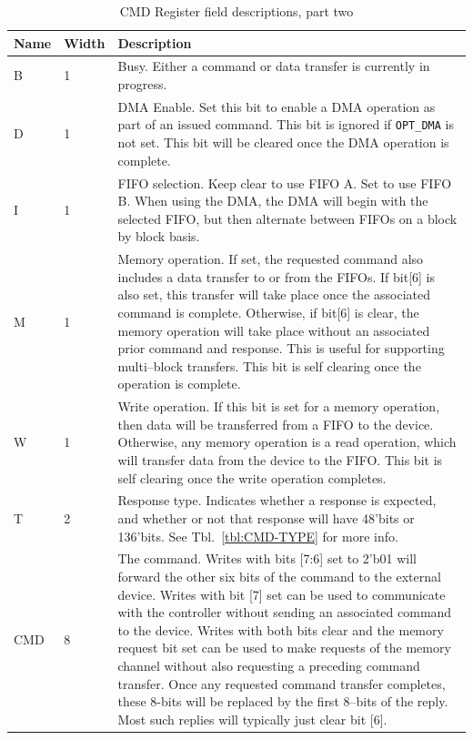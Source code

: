 \documentclass{gqtekspec}
\begin{document}
\begin{table}\begin{center}
\begin{tabular}{|p{1.2in}|p{0.5in}|p{4.0in}|}\hline
	\rowcolor[gray]{0.85} Name & Width & Description\\\hline\hline
B & 1 & Busy.  Either a command or data transfer is currently in
	progress.\\
D & 1 & DMA Enable.  Set this bit to enable a DMA operation as part of an
	issued command.  This bit is ignored if {\tt OPT\_DMA} is not set.
	This bit will be cleared once the DMA operation is complete.\\
I & 1 & FIFO selection.  Keep clear to use FIFO A.  Set to use FIFO B.
	When using the DMA, the DMA will begin with the selected FIFO, but then
	alternate between FIFOs on a block by block basis.  \\
M & 1 & Memory operation.  If set, the requested command also includes a data
	transfer to or from the FIFOs.  If bit[6] is also set, this transfer
	will take place once the associated command is complete.  Otherwise, if
	bit[6] is clear, the memory operation will take place without an
	associated prior command and response.  This is useful for supporting
	multi--block transfers.  This bit is self clearing once the operation
	is complete.\\
W & 1 & Write operation.  If this bit is set for a memory operation, then
	data will be transferred from a FIFO to the device.  Otherwise, any
	memory operation is a read operation, which will transfer data from
	the device to the FIFO.  This bit is self clearing once the write
	operation completes.\\
T & 2 & Response type.  Indicates whether a response is expected, and
	whether or not that response will have 48'bits or 136'bits.
	See Tbl.~\ref{tbl:CMD-TYPE} for more info.\\
CMD & 8 & The command.  Writes with bits [7:6] set to 2'b01 will forward
	the other six bits of the command to the external device.  Writes with
	bit [7] set can be used to communicate with the controller without
	sending an associated command to the device.  Writes with both bits
	clear and the memory request bit set can be used to make requests of
	the memory channel without also requesting a preceding command
	transfer.  Once any requested command transfer completes, these
	8-bits will be replaced by the first 8--bits of the reply.  Most
	such replies will typically just clear bit [6].
	\\\hline
\end{tabular}
\caption{CMD Register field descriptions, part two}\label{tbl:CMD2}
\end{center}\end{table}
\end{document}
